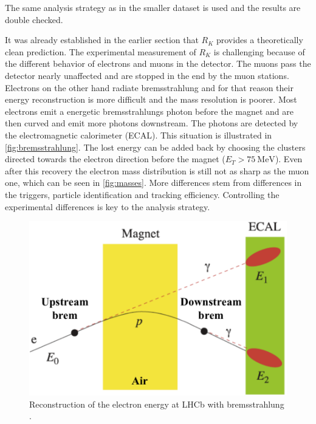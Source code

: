The same analysis strategy as in the smaller dataset is used and the
results are double checked.

It was already established in the earlier section that $R_K$ provides
a theoretically clean prediction.
The experimental measurement of $R_K$ is challenging because
of the different behavior of electrons and muons in the detector.
The muons pass the detector nearly unaffected and are stopped in the end
by the muon stations.
Electrons on the other hand radiate bremsstrahlung and for that
reason their energy reconstruction is more difficult
and the mass resolution is poorer.
Most electrons emit a energetic bremsstrahlungs photon before the magnet and
are then curved and emit more photons downstream. The photons are detected by the
electromagnetic calorimeter (ECAL).
This situation is illustrated
in \autoref{fig:bremsstrahlung}.
The lost energy can be added back by choosing
the clusters directed towards the electron direction before the magnet ($E_{T}>\SI{75}{\mega\electronvolt}$).
Even after this recovery the electron mass distribution is still not as sharp as the muon one, which can
be seen in \autoref{fig:masses}.
More differences stem from differences in the triggers, particle identification and tracking efficiency.
Controlling the experimental differences is key to the analysis strategy.
\begin{figure}
	\centering
	\includegraphics[width=0.8\linewidth]{media/electronbrems.png}
	\caption{Reconstruction of the electron energy at LHCb with bremsstrahlung \cite{petridis2021test}.}%
	\label{fig:bremsstrahlung}
\end{figure}

